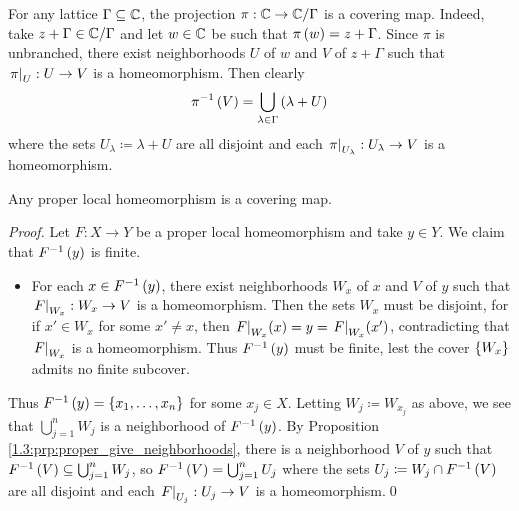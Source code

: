 \documentclass[../Moduli_Spaces_of_Riemann_Surfaces.tex]{subfiles}
\begin{document}
    \begin{example}
        For any lattice $\Gamma\subseteq\mathbb{C}$, the projection $\pi:\mathbb{C}\to\mathbb{C}/\Gamma$ is a covering map. Indeed, take $z+\Gamma\in\mathbb{C}/\Gamma$ and let $w\in\mathbb{C}$ be such that $\pi\left(w\right)=z+\Gamma$. Since $\pi$ is unbranched, there exist neighborhoods $U$ of $w$ and $V$ of $z+\Gamma$ such that $\left.\pi\right|_{U}:U\to V$ is a homeomorphism. Then clearly
        \begin{equation*}
            \pi^{-1}\left(V\right)=\bigcup_{\lambda\in\Gamma}\left(\lambda+U\right)
        \end{equation*}
        where the sets $U_\lambda\coloneqq\lambda+U$ are all disjoint and each $\left.\pi\right|_{U_\lambda}:U_\lambda\to V$ is a homeomorphism.\exqed
    \end{example}
    \begin{proposition}
        Any proper local homeomorphism is a covering map.
    \end{proposition}
    \begin{proof}
        Let $F:X\to Y$ be a proper local homeomorphism and take $y\in Y$. We claim that $F^{-1}\left(y\right)$ is finite.
        \begin{itemize}
            \item For each $x\in F^{-1}\left(y\right)$, there exist neighborhoods $W_x$ of $x$ and $V$ of $y$ such that $\left.F\right|_{W_x}:W_x\to V$ is a homeomorphism. Then the sets $W_x$ must be disjoint, for if $x'\in W_x$ for some $x'\neq x$, then $\left.F\right|_{W_x}\!\left(x\right)=y=\left.F\right|_{W_x}\!\left(x'\right)$, contradicting that $\left.F\right|_{W_x}$ is a homeomorphism. Thus $F^{-1}\left(y\right)$ must be finite, lest the cover $\left\{W_x\right\}$ admits no finite subcover.
        \end{itemize}
        Thus $F^{-1}\left(y\right)=\left\{x_1,\dots,x_n\right\}$ for some $x_j\in X$. Letting $W_j\coloneqq W_{x_j}$ as above, we see that $\bigcup_{j=1}^{n}W_j$ is a neighborhood of $F^{-1}\left(y\right)$. By Proposition \ref{1.3:prp:proper_give_neighborhoods}, there is a neighborhood $V$ of $y$ such that $F^{-1}\left(V\right)\subseteq\bigcup_{j=1}^{n}W_j$, so $F^{-1}\left(V\right)=\bigcup_{j=1}^{n}U_j$ where the sets $U_j\coloneqq W_j\cap F^{-1}\left(V\right)$ are all disjoint and each $\left.F\right|_{U_j}:U_j\to V$ is a homeomorphism.\qed
    \end{proof}
\end{document}
